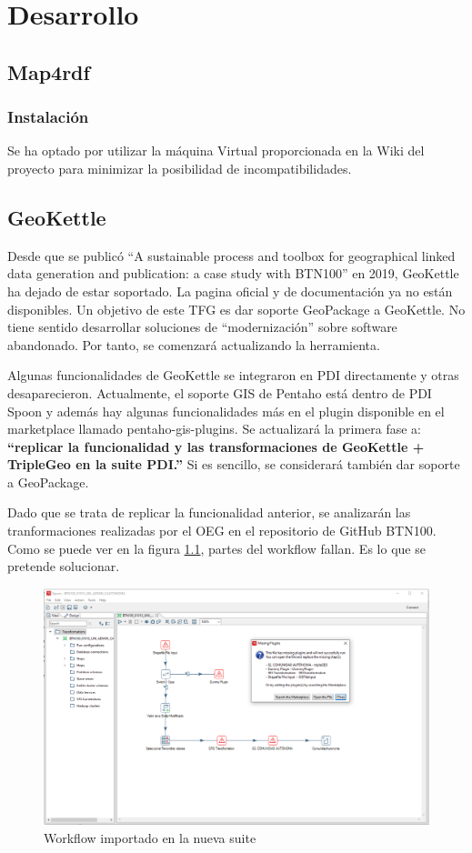 \chapter{Desarrollo}

\section{Map4rdf}
\subsection{Instalación}

Se ha optado por utilizar la máquina Virtual proporcionada en la Wiki del proyecto para minimizar la posibilidad
de incompatibilidades.

\section{GeoKettle}

Desde que se publicó ``A sustainable process and toolbox for geographical linked data generation and
publication: a case study with BTN100'' en 2019, GeoKettle ha dejado de estar soportado. La pagina oficial y de
documentación ya no están disponibles.
Un objetivo de este TFG es dar soporte GeoPackage a GeoKettle. No tiene sentido desarrollar soluciones de
``modernización'' sobre software abandonado. Por tanto, se comenzará actualizando la herramienta.

Algunas funcionalidades de GeoKettle se integraron en PDI directamente y otras desaparecieron. 
Actualmente, el soporte GIS de Pentaho está dentro de PDI Spoon y además hay algunas funcionalidades más en
 el plugin disponible en el marketplace llamado pentaho-gis-plugins. Se actualizará la primera fase a:
\textbf{``replicar la funcionalidad y las transformaciones de GeoKettle + TripleGeo en la suite PDI.''} Si es sencillo,
se considerará también dar soporte a GeoPackage.

Dado que se trata de replicar la funcionalidad anterior, se analizarán las tranformaciones realizadas por el OEG
en el repositorio de GitHub BTN100. Como se puede ver en la figura \ref{fig:spoon-missing-plugins}, partes del workflow fallan. Es lo que se pretende
solucionar.

\begin{figure}[h]
    \includegraphics[width=\textwidth]{images/spoon-missing-plugins.png}
    \centering
    \caption{Workflow importado en la nueva suite}
    \label{fig:spoon-missing-plugins}
\end{figure}

